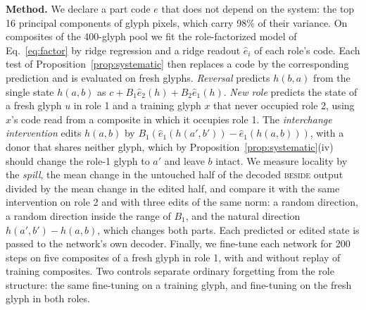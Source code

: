 \documentclass[10pt]{article}
\theoremstyle{plain}
\theoremstyle{remark}
\begin{document}
\textbf{Method.} We declare a part code $e$ that does not depend on the system: the top 16 principal components of glyph pixels, which carry 98\% of their variance. On composites of the 400-glyph pool we fit the role-factorized model of Eq.~\eqref{eq:factor} by ridge regression and a ridge readout $\hat{e}_i$ of each role's code. Each test of Proposition~\ref{prop:systematic} then replaces a code by the corresponding prediction and is evaluated on fresh glyphs. \emph{Reversal} predicts $h(b, a)$ from the single state $h(a, b)$ as $c + B_1 \hat{e}_2(h) + B_2 \hat{e}_1(h)$. \emph{New role} predicts the state of a fresh glyph $u$ in role 1 and a training glyph $x$ that never occupied role 2, using $x$'s code read from a composite in which it occupies role 1. The \emph{interchange intervention} edits $h(a, b)$ by $B_1(\hat{e}_1(h(a', b')) - \hat{e}_1(h(a, b)))$, with a donor that shares neither glyph, which by Proposition~\ref{prop:systematic}(iv) should change the role-1 glyph to $a'$ and leave $b$ intact. We measure locality by the \emph{spill}, the mean change in the untouched half of the decoded \textsc{beside} output divided by the mean change in the edited half, and compare it with the same intervention on role 2 and with three edits of the same norm: a random direction, a random direction inside the range of $B_1$, and the natural direction $h(a', b') - h(a, b)$, which changes both parts. Each predicted or edited state is passed to the network's own decoder. Finally, we fine-tune each network for 200 steps on five composites of a fresh glyph in role 1, with and without replay of training composites. Two controls separate ordinary forgetting from the role structure: the same fine-tuning on a training glyph, and fine-tuning on the fresh glyph in both roles.
\end{document}
